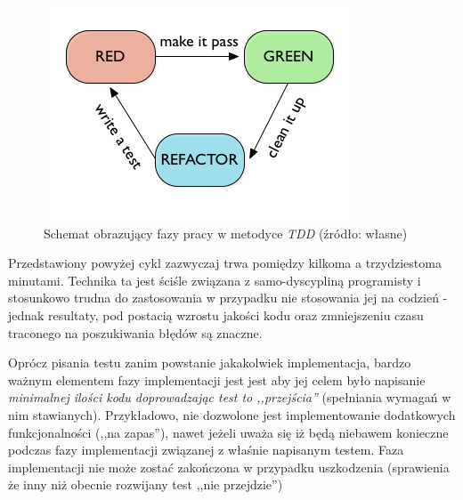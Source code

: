 \documentclass[pdflatex,11pt]{aghdpl}
\begin{document}
\begin{figure}[ch]
 \begin{center}
  \includegraphics[scale=0.8]{tdd_cycle}
 \end{center}
 \label{tdd_cycle}
 \caption{Schemat obrazujący fazy pracy w metodyce \textit{TDD} \small{(źródło: własne)}}
\end{figure}


Przedstawiony powyżej cykl zazwyczaj trwa pomiędzy kilkoma a trzydziestoma minutami. Technika ta jest ściśle związana z samo-dyscypliną programisty
i stosunkowo trudna do zastosowania w przypadku nie stosowania jej na codzień - jednak resultaty, pod postacią wzrostu jakości kodu oraz zmniejszeniu 
czasu traconego na poszukiwania błędów są znaczne.

Oprócz pisania testu zanim powstanie jakakolwiek implementacja, bardzo ważnym elementem fazy implementacji jest jest aby jej celem 
było napisanie \textit{minimalnej ilości kodu doprowadzając test to ,,przejścia''} (spełniania wymagań w nim stawianych). Przykładowo, nie dozwolone jest
implementowanie dodatkowych funkcjonalności (,,na zapas''), nawet jeżeli uważa się iż będą niebawem konieczne podczas fazy implementacji związanej 
z właśnie napisanym testem. Faza implementacji nie może zostać zakończona w przypadku uszkodzenia (sprawienia że inny niż obecnie rozwijany test ,,nie przejdzie'')
\end{document}
